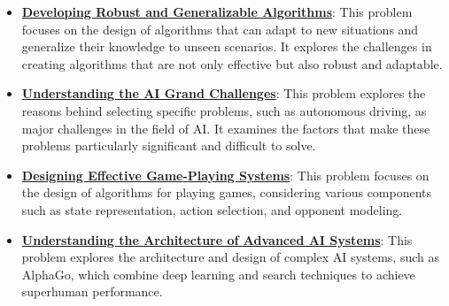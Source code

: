 \documentclass{article}%
\begin{document}
\begin{itemize}[leftmargin=*]
\item \href{https://purdue.brightspace.com/d2l/common/assets/pdfjs-d2l-dist/1.0.14-legacy/web/viewer.html?file=%2Fcontent%2Fenforced%2F1095467-wl.202510.CS.24300.001%2F02L2-Intro.pdf%3Fou%3D1095467&lang=en-us&container=d2l-fileviewer-rendered-pdf&fullscreen=d2l-fileviewer-rendered-pdf-dialog&height=667#page=36}{\textbf{Developing Robust and Generalizable Algorithms}}: This problem focuses on the design of algorithms that can adapt to new situations and generalize their knowledge to unseen scenarios. It explores the challenges in creating algorithms that are not only effective but also robust and adaptable.%
\item \href{https://purdue.brightspace.com/d2l/common/assets/pdfjs-d2l-dist/1.0.14-legacy/web/viewer.html?file=%2Fcontent%2Fenforced%2F1095467-wl.202510.CS.24300.001%2F02L2-Intro.pdf%3Fou%3D1095467&lang=en-us&container=d2l-fileviewer-rendered-pdf&fullscreen=d2l-fileviewer-rendered-pdf-dialog&height=667#page=43}{\textbf{Understanding the AI Grand Challenges}}: This problem explores the reasons behind selecting specific problems, such as autonomous driving, as major challenges in the field of AI. It examines the factors that make these problems particularly significant and difficult to solve.%
\item \href{https://purdue.brightspace.com/d2l/common/assets/pdfjs-d2l-dist/1.0.14-legacy/web/viewer.html?file=%2Fcontent%2Fenforced%2F1095467-wl.202510.CS.24300.001%2F02L2-Intro.pdf%3Fou%3D1095467&lang=en-us&container=d2l-fileviewer-rendered-pdf&fullscreen=d2l-fileviewer-rendered-pdf-dialog&height=667#page=47}{\textbf{Designing Effective Game{-}Playing Systems}}: This problem focuses on the design of algorithms for playing games, considering various components such as state representation, action selection, and opponent modeling.%
\item \href{https://purdue.brightspace.com/d2l/common/assets/pdfjs-d2l-dist/1.0.14-legacy/web/viewer.html?file=%2Fcontent%2Fenforced%2F1095467-wl.202510.CS.24300.001%2F02L2-Intro.pdf%3Fou%3D1095467&lang=en-us&container=d2l-fileviewer-rendered-pdf&fullscreen=d2l-fileviewer-rendered-pdf-dialog&height=667#page=50}{\textbf{Understanding the Architecture of Advanced AI Systems}}: This problem explores the architecture and design of complex AI systems, such as AlphaGo, which combine deep learning and search techniques to achieve superhuman performance.%
\end{itemize}%
\end{document}
